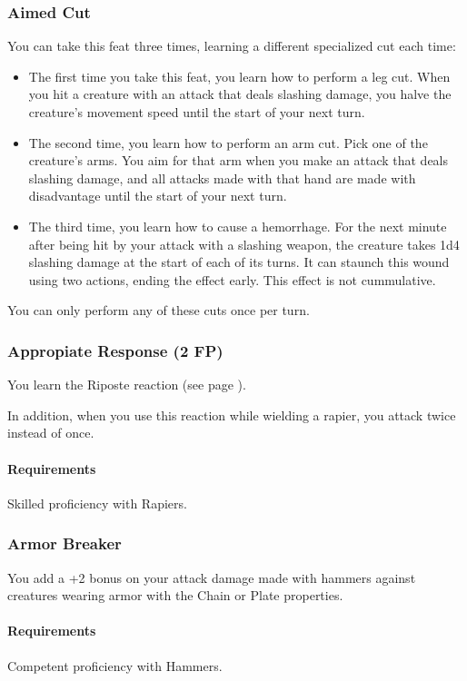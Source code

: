 \subsubsection{Aimed Cut} \label{feat::aimedcut}
    You can take this feat three times, learning a different specialized cut each time:
    \begin{itemize}
        \item The first time you take this feat, you learn how to perform a leg cut.
        When you hit a creature with an attack that deals slashing damage, you halve the creature's movement speed until the start of your next turn.
        \item The second time, you learn how to perform an arm cut.
        Pick one of the creature's arms.
        You aim for that arm when you make an attack that deals slashing damage, and all attacks made with that hand are made with disadvantage until the start of your next turn.
        \item The third time, you learn how to cause a hemorrhage.
        For the next minute after being hit by your attack with a slashing weapon, the creature takes 1d4 slashing damage at the start of each of its turns.
        It can staunch this wound using two actions, ending the effect early.
        This effect is not cummulative.
    \end{itemize}

    You can only perform any of these cuts once per turn.
\subsubsection{Appropiate Response (2 FP)} \label{feat::appropiateresponse}
    You learn the Riposte reaction (see page \pageref{act::riposte}).

    In addition, when you use this reaction while wielding a rapier, you attack twice instead of once.
    \paragraph{Requirements} Skilled proficiency with Rapiers.
\subsubsection{Armor Breaker} \label{feat::armorbreaker}
    You add a +2 bonus on your attack damage made with hammers against creatures wearing armor with the Chain or Plate properties.
    \paragraph{Requirements} Competent proficiency with Hammers.
